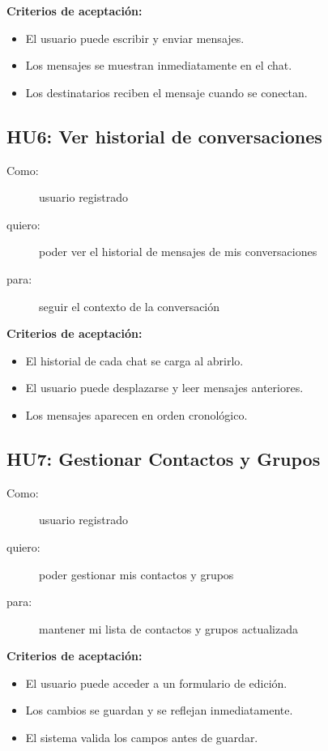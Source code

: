 \textbf{Criterios de aceptación:}
\begin{itemize}
    \item El usuario puede escribir y enviar mensajes.
    \item Los mensajes se muestran inmediatamente en el chat.
    \item Los destinatarios reciben el mensaje cuando se conectan.
\end{itemize}

\subsection*{HU6: Ver historial de conversaciones}
\begin{description}
  \item[Como:] usuario registrado
  \item[quiero:] poder ver el historial de mensajes de mis conversaciones
  \item[para:] seguir el contexto de la conversación
\end{description}

\textbf{Criterios de aceptación:}
\begin{itemize}
    \item El historial de cada chat se carga al abrirlo.
    \item El usuario puede desplazarse y leer mensajes anteriores.
    \item Los mensajes aparecen en orden cronológico.
\end{itemize}

\subsection*{HU7: Gestionar Contactos y Grupos}
\begin{description}
  \item[Como:] usuario registrado
  \item[quiero:] poder gestionar mis contactos y grupos
  \item[para:] mantener mi lista de contactos y grupos actualizada
\end{description}

\textbf{Criterios de aceptación:}
\begin{itemize}
    \item El usuario puede acceder a un formulario de edición.
    \item Los cambios se guardan y se reflejan inmediatamente.
    \item El sistema valida los campos antes de guardar.
\end{itemize}

